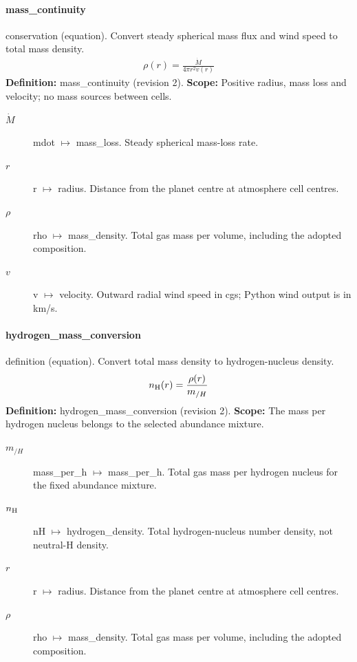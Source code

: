 \paragraph{mass\_continuity}
conservation (equation). Convert steady spherical mass flux and wind speed to total mass density.
\begin{equation}
\begin{aligned}
\rho{\left(r \right)} = \frac{\dot M}{4 \pi r^{2} v{\left(r \right)}}
\end{aligned}
\label{eq:escape.mathematical_5f_model_3a_composition_5f_wind:mass_5f_continuity:2}
\end{equation}
\noindent\textbf{Definition:} mass\_continuity (revision 2).
\textbf{Scope:} Positive radius, mass loss and velocity; no mass sources between cells.

\begin{description}
\item[$\dot M$] mdot $\mapsto$ mass\_loss. Steady spherical mass-loss rate.
\item[$r$] r $\mapsto$ radius. Distance from the planet centre at atmosphere cell centres.
\item[$\rho$] rho $\mapsto$ mass\_density. Total gas mass per volume, including the adopted composition.
\item[$v$] v $\mapsto$ velocity. Outward radial wind speed in cgs; Python wind output is in km/s.
\end{description}

\paragraph{hydrogen\_mass\_conversion}
definition (equation). Convert total mass density to hydrogen-nucleus density.
\begin{equation}
\begin{aligned}
n_{\rm H}{\left(r \right)} = \frac{\rho{\left(r \right)}}{m_{/H}}
\end{aligned}
\label{eq:escape.mathematical_5f_model_3a_composition_5f_wind:hydrogen_5f_mass_5f_conversion:2}
\end{equation}
\noindent\textbf{Definition:} hydrogen\_mass\_conversion (revision 2).
\textbf{Scope:} The mass per hydrogen nucleus belongs to the selected abundance mixture.

\begin{description}
\item[$m_{/H}$] mass\_per\_h $\mapsto$ mass\_per\_h. Total gas mass per hydrogen nucleus for the fixed abundance mixture.
\item[$n_{\rm H}$] nH $\mapsto$ hydrogen\_density. Total hydrogen-nucleus number density, not neutral-H density.
\item[$r$] r $\mapsto$ radius. Distance from the planet centre at atmosphere cell centres.
\item[$\rho$] rho $\mapsto$ mass\_density. Total gas mass per volume, including the adopted composition.
\end{description}
